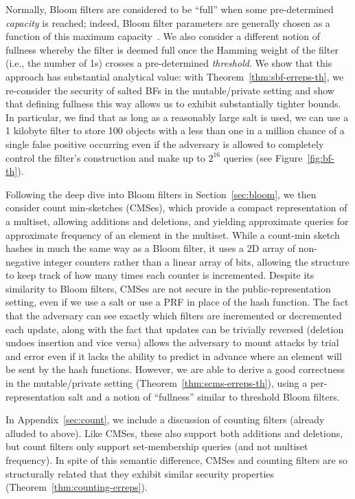 Normally, Bloom filters are considered to be ``full'' when some pre-determined
\emph{capacity} is reached; indeed, Bloom filter parameters are generally chosen
as a function of this maximum capacity~\cite{kirsch2006less}.
%
We also consider a different notion of fullness whereby the filter is deemed full
once the Hamming weight of the filter (i.e., the number of 1s) crosses a
pre-determined \emph{threshold}. We show that this approach has substantial
analytical value: with Theorem~\ref{thm:sbf-erreps-th}, we re-consider the
security of salted BFs in the mutable/private setting and show that defining
fullness this way allows us to exhibit substantially tighter bounds. In
particular, we find that as long as a reasonably large salt is used, we can use
a 1 kilobyte filter to store 100 objects with a less than one in a million
chance of a single false positive occurring even if the adversary is allowed
to completely control the filter's construction and make up to $2^{16}$ queries
(see Figure~\ref{fig:bf-th}).


Following the deep dive into Bloom filters in Section~\ref{sec:bloom}, we then
consider count min-sketches (CMSes), which provide a compact representation of a
multiset, allowing additions and deletions, and yielding approximate queries for
approximate frequency of an element in the multiset. While a count-min sketch
hashes in much the same way as a Bloom filter, it uses a 2D array of non-negative
integer counters rather than a linear array of bits, allowing the structure to
keep track of how many times each counter is incremented.
%
Despite its similarity to Bloom filters, CMSes are not secure in the
public-representation setting, even if we use a salt or use a PRF in place of
the hash function. The fact that the adversary can see exactly which filters are
incremented or decremented each update, along with the fact that updates can be
trivially reversed (deletion undoes insertion and vice versa) allows the
adversary to mount attacks by trial and error even if it lacks the ability to
predict in advance where an element will be sent by the hash functions.
%
However, we are able to derive a good correctness in the mutable/private setting
(Theorem~\ref{thm:scms-erreps-th}), using a per-representation salt and a
notion of ``fullness'' similar to threshold Bloom filters.

In Appendix~\ref{sec:count}, we include a discussion of counting filters
(already alluded to above).
%
Like CMSes, these also support both additions and deletions, but count filters
only support set-membership queries (and not multiset frequency).
%
In spite of this semantic difference, CMSes and counting filters are
so structurally related that they exhibit similar security properties
(Theorem~\ref{thm:counting-erreps}).

